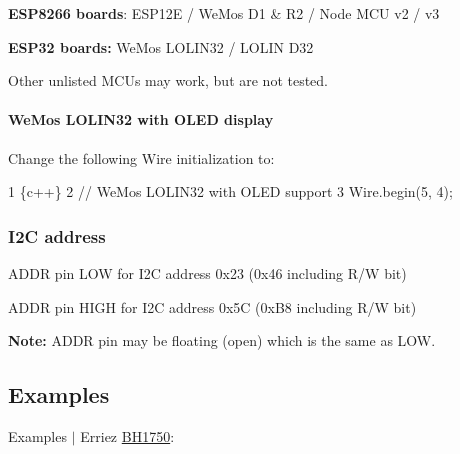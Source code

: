 \begin{DoxyItemize}
\item {\bfseries E\+S\+P8266 boards}\+: E\+S\+P12E / We\+Mos D1 \& R2 / Node M\+CU v2 / v3
\item {\bfseries E\+S\+P32 boards\+:} We\+Mos L\+O\+L\+I\+N32 / L\+O\+L\+IN D32
\end{DoxyItemize}

Other unlisted M\+CU\textquotesingle{}s may work, but are not tested.

\paragraph*{We\+Mos L\+O\+L\+I\+N32 with O\+L\+ED display}

Change the following Wire initialization to\+:


\begin{DoxyCode}
1 \{c++\}
2 // WeMos LOLIN32 with OLED support
3 Wire.begin(5, 4);
\end{DoxyCode}


\subsubsection*{I2C address}


\begin{DoxyItemize}
\item {\ttfamily A\+D\+DR} pin {\ttfamily L\+OW} for I2C address 0x23 (0x46 including R/W bit)
\item {\ttfamily A\+D\+DR} pin {\ttfamily H\+I\+GH} for I2C address 0x5C (0x\+B8 including R/W bit)
\end{DoxyItemize}

{\bfseries Note\+:} {\ttfamily A\+D\+DR} pin may be floating (open) which is the same as L\+OW.

\subsection*{Examples}

Examples $\vert$ Erriez \hyperlink{class_b_h1750}{B\+H1750}\+:



